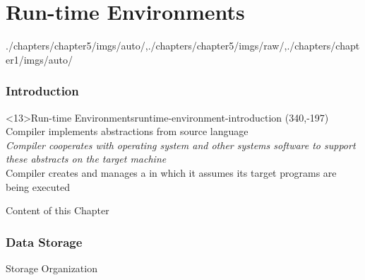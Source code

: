 \part[author={\protect\insertauthor},label={chap:runtime_environments}]{Run-time Environments}

\begin{graphicspathcontext}{{./chapters/chapter5/imgs/auto/},{./chapters/chapter5/imgs/raw/},{./chapters/chapter1/imgs/auto/}}
\begin{bibunit}[apalike]

\tableofcontentslide

\section{Introduction}
\sectiontableofcontentslide

\begin{rightlawnframe}<13>{Run-time Environments}{runtime-environment-introduction}
	\putat*(340,-197){}
	Compiler implements abstractions from source language \\[.2cm]
	\emph{Compiler cooperates with operating system and other systems software to support these abstracts on the target machine} \\[.2cm]
	Compiler creates and manages a  in which it assumes its target programs are being executed
\end{rightlawnframe}

\begin{frame}{Content of this Chapter}
	\hfill
	\hfill
\end{frame}

\section{Data Storage}
\sectiontableofcontentslide

\begin{frame}{Storage Organization}
	\begin{rightarrowsequence}
	\end{rightarrowsequence}
\end{frame}


\end{bibunit}
\end{graphicspathcontext}
